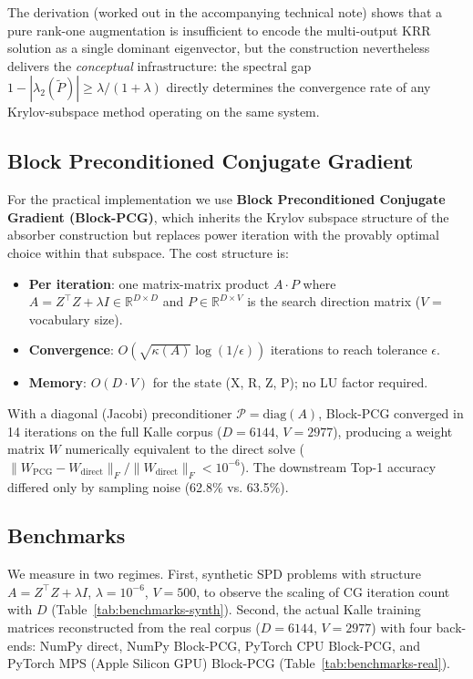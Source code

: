 \documentclass[11pt,a4paper]{article}
\begin{document}
The derivation (worked out in the accompanying technical note) shows that a pure rank-one augmentation is insufficient to encode the multi-output KRR solution as a single dominant eigenvector, but the construction nevertheless delivers the \emph{conceptual} infrastructure: the spectral gap $1 - |\lambda_2(\tilde P)| \geq \lambda/(1+\lambda)$ directly determines the convergence rate of any Krylov-subspace method operating on the same system.

\subsection{Block Preconditioned Conjugate Gradient}

For the practical implementation we use \textbf{Block Preconditioned Conjugate Gradient (Block-PCG)}, which inherits the Krylov subspace structure of the absorber construction but replaces power iteration with the provably optimal choice within that subspace. The cost structure is:
\begin{itemize}
  \setlength\itemsep{0pt}
  \item \textbf{Per iteration}: one matrix-matrix product $A \cdot P$ where $A = Z^\top Z + \lambda I \in \mathbb{R}^{D \times D}$ and $P \in \mathbb{R}^{D \times V}$ is the search direction matrix ($V$ = vocabulary size).
  \item \textbf{Convergence}: $O(\sqrt{\kappa(A)} \log(1/\epsilon))$ iterations to reach tolerance $\epsilon$.
  \item \textbf{Memory}: $O(D \cdot V)$ for the state (X, R, Z, P); no LU factor required.
\end{itemize}
With a diagonal (Jacobi) preconditioner $\mathcal{P} = \mathrm{diag}(A)$, Block-PCG converged in 14 iterations on the full Kalle corpus ($D = 6144$, $V = 2977$), producing a weight matrix $W$ numerically equivalent to the direct solve ($\|W_{\text{PCG}} - W_{\text{direct}}\|_F / \|W_{\text{direct}}\|_F < 10^{-6}$). The downstream Top-1 accuracy differed only by sampling noise (62.8\% vs. 63.5\%).

\subsection{Benchmarks}

We measure in two regimes. First, synthetic SPD problems with structure $A = Z^\top Z + \lambda I$, $\lambda = 10^{-6}$, $V = 500$, to observe the scaling of CG iteration count with $D$ (Table~\ref{tab:benchmarks-synth}). Second, the actual Kalle training matrices reconstructed from the real corpus ($D = 6144$, $V = 2977$) with four back-ends: NumPy direct, NumPy Block-PCG, PyTorch CPU Block-PCG, and PyTorch MPS (Apple Silicon GPU) Block-PCG (Table~\ref{tab:benchmarks-real}).
\end{document}
